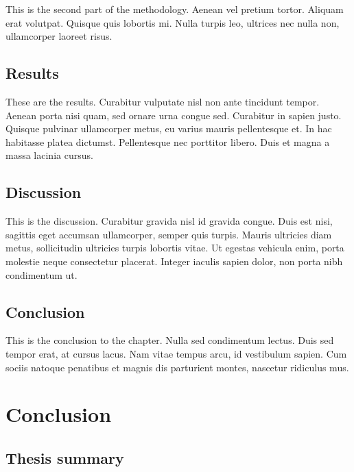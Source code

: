 \documentclass[12pt,a4paper,]{report}
\begin{document}
This is the second part of the methodology. Aenean vel pretium tortor.
Aliquam erat volutpat. Quisque quis lobortis mi. Nulla turpis leo,
ultrices nec nulla non, ullamcorper laoreet risus.

\hypertarget{results-3}{%
\section{Results}\label{results-3}}

These are the results. Curabitur vulputate nisl non ante tincidunt
tempor. Aenean porta nisi quam, sed ornare urna congue sed. Curabitur in
sapien justo. Quisque pulvinar ullamcorper metus, eu varius mauris
pellentesque et. In hac habitasse platea dictumst. Pellentesque nec
porttitor libero. Duis et magna a massa lacinia cursus.

\hypertarget{discussion-3}{%
\section{Discussion}\label{discussion-3}}

This is the discussion. Curabitur gravida nisl id gravida congue. Duis
est nisi, sagittis eget accumsan ullamcorper, semper quis turpis. Mauris
ultricies diam metus, sollicitudin ultricies turpis lobortis vitae. Ut
egestas vehicula enim, porta molestie neque consectetur placerat.
Integer iaculis sapien dolor, non porta nibh condimentum ut.

\hypertarget{conclusion-4}{%
\section{Conclusion}\label{conclusion-4}}

This is the conclusion to the chapter. Nulla sed condimentum lectus.
Duis sed tempor erat, at cursus lacus. Nam vitae tempus arcu, id
vestibulum sapien. Cum sociis natoque penatibus et magnis dis parturient
montes, nascetur ridiculus mus.

\hypertarget{conclusion-5}{%
\chapter{Conclusion}\label{conclusion-5}}

\hypertarget{thesis-summary}{%
\section{Thesis summary}\label{thesis-summary}}
\end{document}
